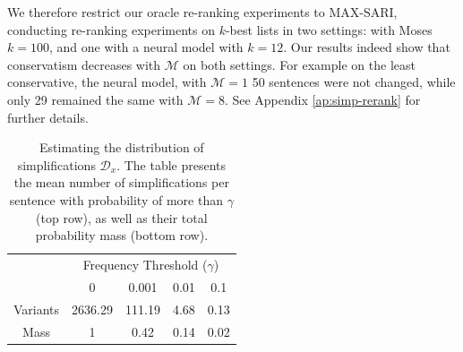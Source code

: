 \documentclass[letterpaper, 11pt]{article}
\begin{document}
We therefore restrict our oracle re-ranking experiments to MAX-SARI, conducting re-ranking experiments on $k$-best
lists in two settings: with Moses \cite{koehn2007koehn} 
$k=100$, and one with a neural model \cite{nisioi2017exploring} with $k=12$. 
Our results indeed show that conservatism decreases with $\mathcal{M}$ on both settings. 
For example on the least conservative, the neural model, with $\mathcal{M}=1$ 50 sentences were not changed, while only 29 remained the same 
with $\mathcal{M}=8$. See Appendix \ref{ap:simp-rerank} for further details.




\begin{table}[t]
	\vspace{-0.5cm}
	\centering
	\small
	\singlespacing
	\begin{tabular}{c|c|c|c|c|}
		& \multicolumn{4}{c|}{Frequency Threshold ($\gamma$)}\\ 
		& \multicolumn{1}{c}{0} & \multicolumn{1}{c}{0.001} & \multicolumn{1}{c}{0.01} & \multicolumn{1}{c|}{0.1}
		\\
		\hline
		Variants & 2636.29 & 111.19 & 4.68 & 0.13
		\\
		Mass & 1 & 0.42 & 0.14 & 0.02\\
		\hline
	\end{tabular}
	\caption{\label{tab:simplifications_dist}
		Estimating the distribution of simplifications $\mathcal{D}_x$.
		The table presents the mean number of simplifications per sentence with probability of more than
		$\gamma$ (top row), as well as their total probability mass (bottom row).
	}
	\vspace{-0.3cm}
\end{table}
\end{document}
